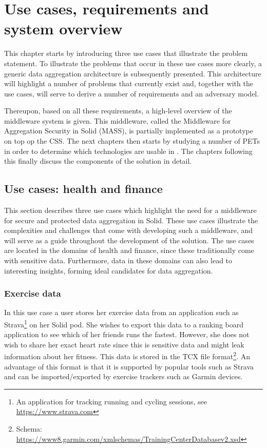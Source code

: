 \chapter{Use cases, requirements and system overview}
\label{cha:solution-overview}
This chapter starts by introducing three use cases that illustrate the problem statement. To illustrate the problems that occur in these use cases more clearly, a generic data aggregation architecture is subsequently presented. This architecture will highlight a number of problems that currently exist and, together with the use cases, will serve to derive a number of 
requirements and an adversary model.

Thereupon, based on all these requirements, a high-level overview of the middleware system is given. This middleware, called the Middleware for Aggregation Security in Solid (MASS), is partially implemented as a prototype on top op the \acrlong{CSS}. The next chapters
then starts by studying a number of \gls{PETs} in order to determine which technologies are usable in \middleware{}. The chapters following this finally discuss the components of the solution in detail.

\section{Use cases: health and finance}
\label{sec:usecases}
This section describes three use cases which highlight the need for a middleware for secure and protected data aggregation in Solid. These use cases illustrate the complexities and challenges that come with developing such a middleware, and will serve as a guide throughout the development of the solution. The use cases are located in the domains of health and finance, since these traditionally come with sensitive data. Furthermore, data in these domains can also lead to interesting insights, forming ideal candidates for data aggregation.

\subsection{Exercise data}
\label{usecase:ex-data}
In this use case a user stores her exercise data from an application such as Strava\footnote{An application for tracking running and cycling sessions, see \url{https://www.strava.com}} on her Solid pod. She wishes to export this data to a ranking board application to see which of her friends runs the fastest. However, she does not wish to share her exact heart rate since this is sensitive data and might leak information about her fitness. This data is stored in the TCX file format\footnote{Schema: \url{https://www8.garmin.com/xmlschemas/TrainingCenterDatabasev2.xsd}}. An advantage of this format is that it is supported by popular tools such as Strava and can be imported/exported by exercise trackers such as Garmin devices.

